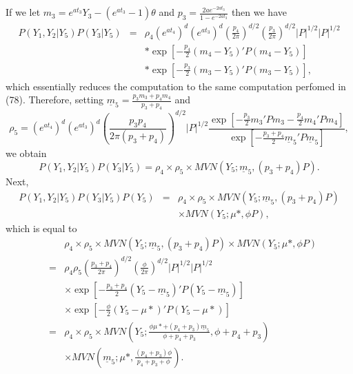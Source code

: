 \documentclass[12pt]{article}
\begin{document}
If we let  
$m_3 = e^{at_3} Y_3 - (e^{at_3} - 1) \theta $ and $p_3 = \frac{2ae^{-2at_3}}{1-e^{-2at_3}} $ then we have 
\begin{eqnarray}
P(Y_1,Y_2| Y_5) P(Y_3 | Y_5) & = & \rho_4 ( e^{at_4} )^d ( e^{at_3} )^d \left( \frac{p_4}{2 \pi} \right) ^{d/2}  \left( \frac{ p_3 }{2 \pi} \right) ^{d/2} |P|^{1/2} |P|^{1/2}  \\
& & * \exp \left[ -\frac{p_4}{2} \left( m_4  - Y_5  \right)' P \left( m_4 - Y_5  \right)  \right] \\
 & & * \exp \left[ -\frac{ p_3 }{2} \left(m_3 - Y_5 \right)' P \left( m_3 - Y_5  \right)   \right] ,
\end{eqnarray}
which essentially reduces the computation to the same computation perfomed in (78).  Therefore, setting 
$\underline{m}_5 = \frac{p_3 m_3 + p_4 m_4}{p_3 + p_4} $ and 
\begin{equation}
\rho_5 = ( e^{at_4} )^d ( e^{at_3} )^d \left( \frac{p_3 p_4}{2 \pi (p_3 + p_4)} \right)^{d/2}  |P|^{1/2} \frac {\exp \left[ -\frac{p_3}{2} m_3' P m_3 -\frac{p_4}{2}m_4'P m_4  \right] }
{ \exp \left[ -\frac{p_3 + p_4}{2} \underline{m}_5' P \underline{m}_5 \right] } ,
\end{equation}
we obtain
\begin{equation}
P(Y_1,Y_2 | Y_5) P(Y_3 | Y_5) = \rho_4 \times \rho_5 \times MVN (Y_5 ; \underline{m}_5, (p_3 + p_4)P) .
\end{equation}
Next, 
\begin{eqnarray}
P(Y_1,Y_2 | Y_5) P(Y_3 | Y_5) P(Y_5) & = & \rho_4 \times \rho_5 \times MVN (Y_5 ; \underline{m}_5, (p_3 + p_4)P) \\
& & \times MVN(Y_5; \mu*, \phi P),
\end{eqnarray}
which is equal to
\begin{eqnarray}
& & \rho_4 \times \rho_5 \times MVN (Y_5 ; \underline{m}_5, (p_3 + p_4)P) \times MVN(Y_5; \mu*, \phi P) \\
& = & \rho_4 \rho_5 \left( \frac{p_3 + p_4}{2 \pi} \right) ^{d/2}  \left( \frac{ \phi }{2 \pi} \right) ^{d/2} |P|^{1/2} |P|^{1/2} \\
& & \times \exp \left[ -\frac{ p_3 + p_4 }{2} \left( Y_5  - \underline{m}_5  \right)' P \left( Y_5 - \underline{m}_5  \right)  \right] \\
& &  \times \exp \left[ -\frac{\phi}{2} \left( Y_5  - \mu*  \right)' P \left( Y_5 - \mu*  \right)  \right]  \\
& = & \rho_4 \times \rho_5 \times MVN \left(Y_5; \frac{\phi \mu* + (p_4 + p_3) \underline{m}_5 }{\phi + p_4 + p_3}, \phi + p_4 + p_3 \right) \\
& & \times MVN \left(\underline{m}_5;\mu*, \frac{(p_4 + p_3)\phi}{p_4 + p_3 + \phi} \right) .
\end{eqnarray}
\end{document}
